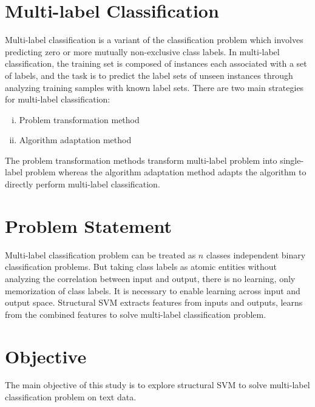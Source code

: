 \section{Multi-label Classification}
Multi-label classification is a variant of the classification problem which involves predicting zero or more mutually non-exclusive class labels. In multi-label classification, the training set is composed of instances each associated with a set of labels, and the task is to predict the label sets of unseen instances through analyzing training samples with known label sets. There are two main strategies for multi-label classification:
\begin{enumerate}[i.]
\item Problem transformation method
\item Algorithm adaptation method
\end{enumerate}
The problem transformation methods transform multi-label problem into single-label problem whereas the algorithm adaptation method adapts the algorithm to directly perform multi-label classification.

\section{Problem Statement}
Multi-label classification problem can be treated as $n$ classes independent binary classification problems. But taking class labels as atomic entities without analyzing the correlation between input and output, there is no learning, only memorization of class labels. It is necessary to enable learning across input and output space. Structural SVM extracts features from inputs and outputs, learns from the combined features to solve multi-label classification problem.

\section{Objective}
The main objective of this study is to explore structural SVM to solve multi-label classification problem on text data.
